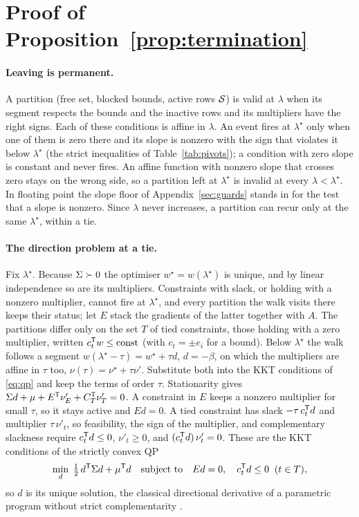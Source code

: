 \section[Proof of the termination proposition]{Proof of Proposition~\ref{prop:termination}}
\label{sec:proof}

\paragraph{Leaving is permanent.}
A partition (free set, blocked bounds, active rows $\mathcal{S}$) is valid at $\lambda$ when
its segment respects the bounds and the inactive rows and its multipliers have the right
signs. Each of these conditions is affine in $\lambda$. An event fires at
$\lambda^{\star}$ only when one of them is zero there and its slope is nonzero with the
sign that violates it below $\lambda^{\star}$ (the strict inequalities of
Table~\ref{tab:pivots}); a condition with zero slope is constant and never fires. An
affine function with nonzero slope that crosses zero stays on the wrong side, so a
partition left at $\lambda^{\star}$ is invalid at every $\lambda < \lambda^{\star}$.
In floating point the slope floor of Appendix~\ref{sec:guards} stands in for the test
that a slope is nonzero. Since $\lambda$ never
increases, a partition can recur only at the same $\lambda^{\star}$, within a tie.

\paragraph{The direction problem at a tie.}
Fix $\lambda^{\star}$. Because $\Sigma \succ 0$ the optimiser
$w^{\star} = w(\lambda^{\star})$ is unique, and by linear independence so are its
multipliers. Constraints with slack, or holding with a nonzero multiplier, cannot fire
at $\lambda^{\star}$, and every partition the walk visits there keeps their status; let
$E$ stack the gradients of the latter together with $A$. The partitions differ only on
the set $T$ of tied constraints, those holding with a zero multiplier, written
$c_t^{\mathsf{T}} w \le \text{const}$ (with $c_t = \pm e_i$ for a bound). Below $\lambda^{\star}$
the walk follows a segment $w(\lambda^{\star} - \tau) = w^{\star} + \tau d$, $d = -\beta$,
on which the multipliers are affine in $\tau$ too, $\nu(\tau) = \nu^{\star} + \tau\nu'$.
Substitute both into the KKT conditions of \eqref{eq:qp} and keep the terms of order
$\tau$. Stationarity gives $\Sigma d + \mu + E^{\mathsf{T}} \nu'_E + C_T^{\mathsf{T}} \nu'_T = 0$. A
constraint in $E$ keeps a nonzero multiplier for small $\tau$, so it stays active and
$E d = 0$. A tied constraint has slack $-\tau\, c_t^{\mathsf{T}} d$ and multiplier
$\tau\,\nu'_t$, so feasibility, the sign of the multiplier, and complementary slackness
require $c_t^{\mathsf{T}} d \le 0$, $\nu'_t \ge 0$, and $(c_t^{\mathsf{T}} d)\,\nu'_t = 0$. These are
the KKT conditions of the strictly convex QP
\[
\min_d\; \tfrac12\, d^{\mathsf{T}} \Sigma d + \mu^{\mathsf{T}} d
\quad\text{subject to}\quad E d = 0,\quad c_t^{\mathsf{T}} d \le 0 \;\; (t \in T),
\]
so $d$ is its unique solution, the classical directional derivative of a parametric
program without strict complementarity \citep{jittorntrum1984, bonnans2000}.

